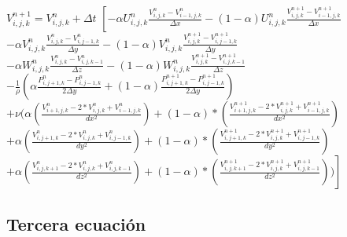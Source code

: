 \documentclass[a4paper]{article}
\begin{document}
\begin{enumerate}
$ {V}^{n+1}_{i,j,k} = V^{n}_{i,j,k} + \Delta t $
$ \left[ - \alpha {U}^{n}_{i,j,k} \frac{ {V}^{n}_{i,j,k} - V^{n}_{i-1,j,k}}{\Delta x} - (1 - \alpha) {U}^{n}_{i,j,k} \frac{ {V}^{n+1}_{i,j,k} - V^{n+1}_{i-1,j,k}}{ \Delta x} \right. $ 
\\
$- \alpha {V}^{n}_{i,j,k} \frac{ {V}^{n}_{i,j,k} - V^{n}_{i,j-1,k}}{ \Delta y} - (1 - \alpha) {V}^{n}_{i,j,k} \frac{ {V}^{n+1}_{i,j,k} - V^{n+1}_{i,j-1,k}}{ \Delta y}$
\\
$- \alpha {W}^{n}_{i,j,k} \frac{ {V}^{n}_{i,j,k} - V^{n}_{i,j,k-1}}{ \Delta z} - (1 - \alpha) {W}^{n}_{i,j,k} \frac{ {V}^{n+1}_{i,j,k} - V^{n+1}_{i,j,k-1}}{ \Delta z}$
\\
$- \frac{1}{\rho} ( \alpha \frac{P^{n}_{i,j+1,k} - P^{n}_{i,j-1,k} }{ 2 \Delta y } + (1 - \alpha) \frac{P^{n+1}_{i,j+1,k} - P^{n+1}_{i,j-1,k} }{ 2 \Delta y })  $
\\
$+ \nu (\alpha (\frac{ V^{n}_{i+1,j,k} - 2*V^{n}_{i,j,k} + V^{n}_{i-1,j,k}}{dx^2}) + (1-\alpha)*(\frac{ V^{n+1}_{i+1,j,k} - 2*V^{n+1}_{i,j,k} + V^{n+1}_{i-1,j,k}}{dx^2})$
\\
$ + \alpha (\frac{ V^{n}_{i,j+1,k} - 2*V^{n}_{i,j,k} + V^{n}_{i,j-1,k}}{dy^2}) + (1-\alpha)*(\frac{ V^{n+1}_{i,j+1,k} - 2*V^{n+1}_{i,j,k} + V^{n+1}_{i,j-1,k}}{dy^2}) $
\\
$\left. + \alpha (\frac{ V^{n}_{i,j,k+1} - 2*V^{n}_{i,j,k} + V^{n}_{i,j,k-1}}{dz^2}) + (1-\alpha)*(\frac{ V^{n+1}_{i,j,k+1} - 2*V^{n+1}_{i,j,k} + V^{n+1}_{i,j,k-1}}{dz^2})) \right]$
~\\

\end{enumerate}

\subsection{Tercera ecuación}
\end{document}
